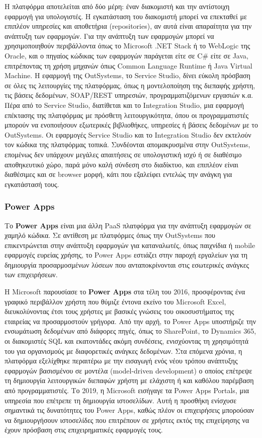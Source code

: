             Η πλατφόρμα αποτελείται από δύο μέρη: έναν διακομιστή και την αντίστοιχη εφαρμογή για υπολογιστές. Η εγκατάσταση του διακομιστή μπορεί να επεκταθεί με επιπλέον υπηρεσίες και αποθετήρια (repositories), αν αυτά είναι απαραίτητα για την ανάπτυξη των εφαρμογών. Για την ανάπτυξη των εφαρμογών μπορεί να χρησιμοποιηθούν περιβάλλοντα όπως το Microsoft .NET Stack ή το WebLogic της Oracle, και ο πηγαίος κώδικας των εφαρμογών παράγεται είτε σε C\# είτε σε Java, επιτρέποντας τη χρήση μηχανών όπως Common Language Runtime ή Java Virtual Machine. Η εφαρμογή της OutSystems, το Service Studio, δίνει εύκολη πρόσβαση σε όλες τις λειτουργίες της πλατφόρμας, όπως η μοντελοποίηση της διεπαφής χρήστη, τις βάσεις δεδομένων, SOAP/REST υπηρεσιών, προγραμματιζόμενων εργασιών κ.α. Πέρα από το Service Studio, διατίθεται και το Integration Studio, μια εφαρμογή επέκτασης της πλατφόρμας με πρόσθετη λειτουργικότητα, όπου οι προγραμματιστές μπορούν να ενοποιήσουν εξωτερικές βιβλιοθήκες, υπηρεσίες ή βάσεις δεδομένων με το OutSystems. Οι εφαρμογές Service Studio και το Integration Studio δεν εκτελούν τον κώδικα της πλατφόρμας τοπικά. Συνδέονται απομακρυσμένα στην OutSystems, επομένως δεν υπάρχουν μεγάλες απαιτήσεις σε υπολογιστική ισχύ ή σε διαθέσιμο αποθηκευτικό χώρο, παρά μόνο καλή σύνδεση στο διαδίκτυο, και επιπλέον είναι διαθέσιμες και σε browser μορφή, κάτι που εξαλείφει εντελώς την ανάγκη για εγκατάστασή τους. \cite{OutSystemsGolovin} \cite{OutSystemsSite}

            \subsubsection{Power Apps}
                Το \textbf{Power Apps} είναι μια άλλη PaaS πλατφόρμα για την ανάπτυξη εφαρμογών σε χαμηλό κώδικα. Σε αντίθεση με πλατφόρμες όπως την OutSystems που επικεντρώνεται στην ανάπτυξη εφαρμογών για καταναλωτές, όπως παιχνίδια ή mobile εφαρμογές ευρείας χρήσης, το Power Apps εστιάζει στην παροχή εργαλείων για τη δημιουργία προσαρμοσμένων λύσεων που ανταποκρίνονται στις εσωτερικές ανάγκες των επιχειρήσεων.

                Η Microsoft παρουσίασε το \textbf{Power Apps} στα τέλη του 2016, προσφέροντας ένα γραφικό περιβάλλον χρήστη που θύμιζε έντονα εκείνο του Microsoft Excel, διευκολύνοντας έτσι τους χρήστες με βασικές γνώσεις του οικοσυστήματος της εταιρείας να προσαρμοστούν γρήγορα. Από την αρχή, το Power Apps υποστήριζε την ενσωμάτωση δεδομένων από διάφορες πηγές, όπως το SharePoint, το Dynamics 365, οι διακομιστές SQL και εκατοντάδες ακόμη συνδέσεις, ενισχύοντας τη χρησιμότητά του για οργανισμούς με διαφορετικές ανάγκες δεδομένων. Στα επόμενα χρόνια, η πλατφόρμα εξελίχθηκε περαιτέρω με την εισαγωγή ενός νέου τρόπου ανάπτυξης εφαρμογών βασισμένου σε μοντέλα (model-driven development) ο οποίος επέτρεψε τη δημιουργία λειτουργικών διεπαφών χρήστη με ελάχιστη ή και καθόλου παρέμβαση από προγραμματιστές. Το 2019, η Microsoft εισήγαγε τα Power Apps Portals, μια υπηρεσία που επέτρεπε τη δημιουργία ιστοσελίδων. Αυτή η προσθήκη ενίσχυσε σημαντικά τις δυνατότητες του Power Apps, καθώς πλέον οι επιχειρήσεις μπορούσαν να δημιουργήσουν ιστοσελίδες που επιτρέπουν σε χρήστες εκτός της επιχείρησης να έχουν πρόσβαση στις επιχειρηματικές εφαρμογές τους. \cite{PowerAppsLeung}

